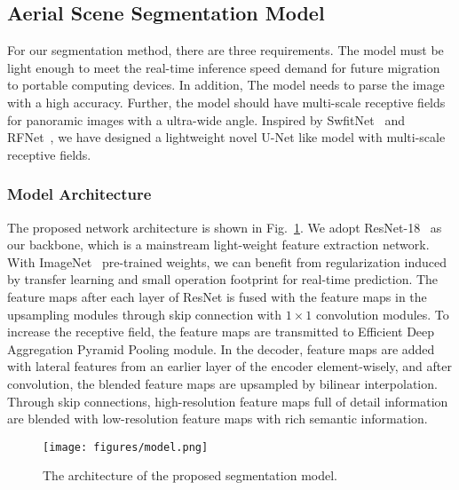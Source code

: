 \documentclass[letterpaper, 10 pt, conference]{ieeeconf}
\begin{document}
\subsection{Aerial Scene Segmentation Model}
 
For our segmentation method, there are three requirements. The model must be light enough to meet the real-time inference speed demand for future migration to portable computing devices. In addition, The model needs to parse the image with a high accuracy. Further, the model should have multi-scale receptive fields for panoramic images with a ultra-wide angle. Inspired by SwfitNet~\cite{swiftnet} and RFNet~\cite{rfnet}, we have designed a lightweight novel U-Net like model with multi-scale receptive fields.

\subsubsection{Model Architecture}

The proposed network architecture is shown in Fig.~\ref{fig:model}.
We adopt ResNet-18~\cite{resnet} as our backbone, which is a mainstream light-weight feature extraction network.
With ImageNet~\cite{russakovsky2015imagenet} pre-trained weights, we can benefit from regularization induced by transfer learning and small operation footprint for real-time prediction.
The feature maps after each layer of ResNet is fused with the feature maps in the upsampling modules through skip connection with $1\times1$ convolution modules.
To increase the receptive field, the feature maps are transmitted to Efficient Deep Aggregation Pyramid Pooling module.
In the decoder, feature maps are added with lateral features from an earlier layer of the encoder element-wisely, and after convolution, the blended feature maps are upsampled by bilinear interpolation. Through skip connections, high-resolution feature maps full of detail information are blended with low-resolution feature maps with rich semantic information.

\begin{figure}[h]
    \centerline{\texttt{[image: figures/model.png]}}
    \caption{The architecture of the proposed segmentation model.}
    \label{fig:model}
\end{figure}
\end{document}
